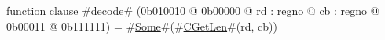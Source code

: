 function clause #\hyperref[zdecode]{decode}# (0b010010 @ 0b00000 @ rd : regno @ cb : regno @    0b00011 @ 0b111111) = #\hyperref[zSome]{Some}#(#\hyperref[zCGetLen]{CGetLen}#(rd, cb))
